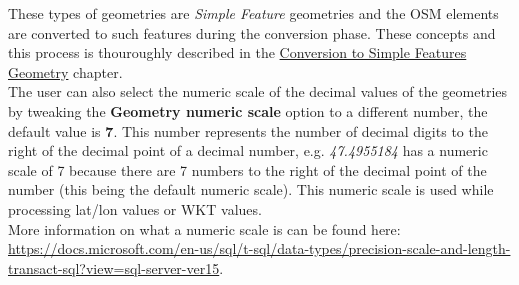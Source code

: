 These types of geometries are \textit{Simple Feature} geometries and the OSM elements are converted to such
features during the conversion phase. These concepts and this process is thouroughly described in the
\hyperref[sec:conversion-to-simple-features-geometry]{Conversion to Simple Features Geometry} chapter.\\
\newline
The user can also select the numeric scale of the decimal values of the geometries by tweaking the \textbf{Geometry numeric scale}
option to a different number, the default value is \textbf{7}. This number represents the number of decimal digits to the right
of the decimal point of a decimal number, e.g. \textit{47.4955184} has a numeric scale of 7 because there are 7 numbers to
the right of the decimal point of the number (this being the default numeric scale). This numeric scale is used
while processing lat/lon values or WKT values. \\
\newline
More information on what a numeric scale is can be found here:
\href{https://docs.microsoft.com/en-us/sql/t-sql/data-types/precision-scale-and-length-transact-sql?view=sql-server-ver15}{https://docs.microsoft.com/en-us/sql/t-sql/data-types/precision-scale-and-length-transact-sql?view=sql-server-ver15}.
